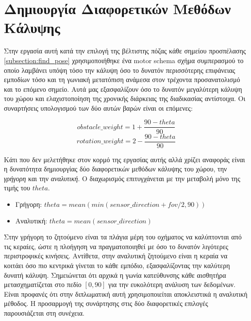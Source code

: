 \chapter{Δημιουργία Διαφορετικών Μεθόδων Κάλυψης}
\label{section:room_classification}

Στην εργασία αυτή κατά την επιλογή της βέλτιστης πόζας κάθε σημείου προσπέλασης \ref{subsection:find_pose} χρησιμοποιήθηκε ένα motor schema σχήμα συμπερασμού το οποίο λαμβάνει υπόψη τόσο την κάλυψη όσο το δυνατόν περισσότερης επιφάνειας εμποδίων τόσο και τη γωνιακή μετατόπιση ανάμεσα στον τρέχοντα προσανατολισμό και το επόμενο σημείο. Αυτά μας εξασφαλίζουν όσο το δυνατόν μεγαλύτερη κάλυψη του χώρου και ελαχιστοποίηση της χρονικής διάρκειας της διαδικασίας αντίστοιχα. Οι συναρτήσεις υπολογισμού των δύο αυτών βαρών είναι οι επόμενες:

\[obstacle\_weight = 1 + \frac{90 - theta}{90}\]
\[rotation\_weight = 2 - \frac{90 - theta}{90}\]


Κάτι που δεν μελετήθηκε στον κορμό της εργασίας αυτής αλλά χρίζει αναφοράς είναι η δυνατότητα δημιουργίας δύο διαφορετικών μεθόδων κάλυψης του χώρου, την \emph{γρήγορη} και την \emph{αναλυτική}. 
Ο διαχωρισμός επιτυγχάνεται με την μεταβολή μόνο της τιμής του $theta$.

\begin{itemize}
    \setlength\itemsep{-0.2em}
    \item Γρήγορη: $theta = mean(min(sensor\_direction + fov/2,90))$ 
    \item Αναλυτική: $theta = mean(sensor\_direction)$
\end{itemize}

Στην γρήγορη το ζητούμενο είναι τα πλάγια μέρη του οχήματος να καλύπτονται από τις κεραίες, ώστε η πλοήγηση να πραγματοποιηθεί με όσο το δυνατόν λιγότερες περιστροφικές κινήσεις. Αντίθετα, στην αναλυτική  ζητούμενο είναι η κεραία να κοιτάει όσο πιο κεντρικά γίνεται το κάθε εμπόδιο, εξασφαλίζοντας την καλύτερη δυνατή κάλυψη. Σημειώνεται ότι αρχικά η γωνία κατεύθυνσης κάθε αισθητήρα μετασχηματίζεται στο πεδίο $[0,90]$ για την ευκολότερη ανάλυση των δεδομένων. Είναι προφανές ότι στην διπλωματική αυτή χρησιμοποιείται αποκλειστικά η αναλυτική μέθοδος. Η προσαρμογή της συνάρτησης στις δύο διαφορετικές επιλογές παρουσιάζεται στη συνέχεια.


